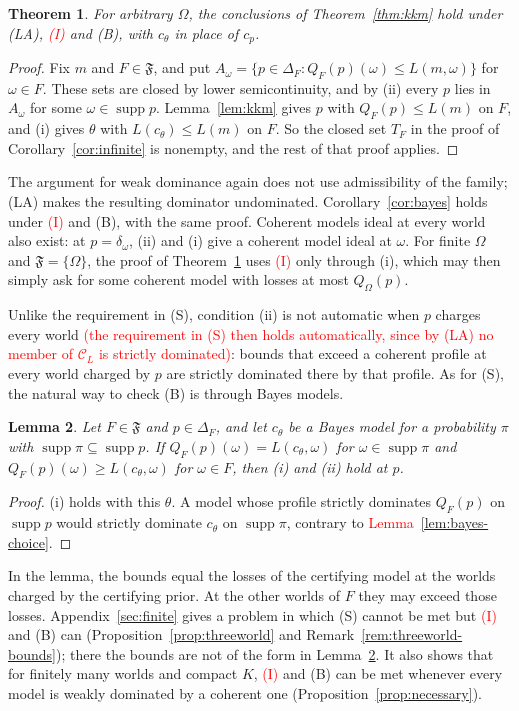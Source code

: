 \documentclass[11pt]{article}
\newtheorem{theorem}{Theorem}[section]
\newtheorem{lemma}[theorem]{Lemma}
\theoremstyle{definition}
\theoremstyle{remark}
\newcommand{\C}{\mathcal C}
\newcommand{\F}{\mathfrak F}
\newcommand{\supp}{\operatorname{supp}}
\begin{document}
\begin{theorem}\label{thm:bounds}
For arbitrary $\Omega$, the conclusions of Theorem~\ref{thm:kkm} hold under (LA), \textcolor{red}{(I)} and (B), with $c_\theta$ in place of $c_p$.
\end{theorem}
\begin{proof}
Fix $m$ and $F\in\F$, and put $A_\omega=\{p\in\Delta_F:Q_F(p)(\omega)\le L(m,\omega)\}$ for $\omega\in F$. These sets are closed by lower semicontinuity, and by (ii) every $p$ lies in $A_\omega$ for some $\omega\in\supp p$. Lemma~\ref{lem:kkm} gives $p$ with $Q_F(p)\le L(m)$ on $F$, and (i) gives $\theta$ with $L(c_\theta)\le L(m)$ on $F$. So the closed set $T_F$ in the proof of Corollary~\ref{cor:infinite} is nonempty, and the rest of that proof applies.
\end{proof}
The argument for weak dominance again does not use admissibility of the family; (LA) makes the resulting dominator undominated. Corollary~\ref{cor:bayes} holds under \textcolor{red}{(I)} and (B), with the same proof. Coherent models ideal at every world also exist: at $p=\delta_\omega$, (ii) and (i) give a coherent model ideal at $\omega$. For finite $\Omega$ and $\F=\{\Omega\}$, the proof of Theorem~\ref{thm:bounds} uses \textcolor{red}{(I)} only through (i), which may then simply ask for some coherent model with losses at most $Q_\Omega(p)$.

Unlike the requirement in (S), condition (ii) is not automatic when $p$ charges every world \textcolor{red}{(the requirement in (S) then holds automatically, since by (LA) no member of $\C_L$ is strictly dominated)}: bounds that exceed a coherent profile at every world charged by $p$ are strictly dominated there by that profile. As for (S), the natural way to check (B) is through Bayes models.

\begin{lemma}\label{lem:bayesbounds}
Let $F\in\F$ and $p\in\Delta_F$, and let $c_\theta$ be a Bayes model for a probability $\pi$ with $\supp\pi\subseteq\supp p$. If $Q_F(p)(\omega)=L(c_\theta,\omega)$ for $\omega\in\supp\pi$ and $Q_F(p)(\omega)\ge L(c_\theta,\omega)$ for $\omega\in F$, then (i) and (ii) hold at $p$.
\end{lemma}
\begin{proof}
(i) holds with this $\theta$. A model whose profile strictly dominates $Q_F(p)$ on $\supp p$ would strictly dominate $c_\theta$ on $\supp\pi$, contrary to \textcolor{red}{Lemma~\ref{lem:bayes-choice}}.
\end{proof}
In the lemma, the bounds equal the losses of the certifying model at the worlds charged by the certifying prior. At the other worlds of $F$ they may exceed those losses. Appendix~\ref{sec:finite} gives a problem in which (S) cannot be met but \textcolor{red}{(I)} and (B) can (Proposition~\ref{prop:threeworld} and Remark~\ref{rem:threeworld-bounds}); there the bounds are not of the form in Lemma~\ref{lem:bayesbounds}. It also shows that for finitely many worlds and compact $K$, \textcolor{red}{(I)} and (B) can be met whenever every model is weakly dominated by a coherent one (Proposition~\ref{prop:necessary}).
\end{document}
